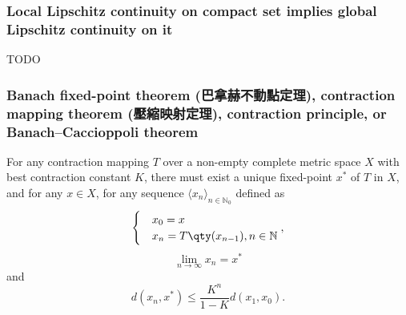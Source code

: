 \subsubsection{Local Lipschitz continuity on compact set implies global Lipschitz continuity on it}
TODO
\subsubsection{Banach fixed-point theorem (巴拿赫不動點定理), contraction mapping theorem (壓縮映射定理), contraction principle, or Banach–Caccioppoli theorem}
For any contraction mapping $T$ over a non-empty complete metric space $X$ with best contraction constant $K$, there must exist a unique fixed-point $x^*$ of $T$ in $X$, and for any $x\in X$, for any sequence $\langle x_n\rangle_{n\in \mathbb {N}_0}$ defined as
\[\begin{cases}
&x_0=x\\
&x_n=T\qty(x_{n-1}),n\in\mathbb{N}
\end{cases},\]
\[\lim_{n\to \infty }x_{n}=x^{*}\]
and
\[d(x_n,x^*)\leq\frac{K^n}{1-K}d(x_1,x_0).\]
